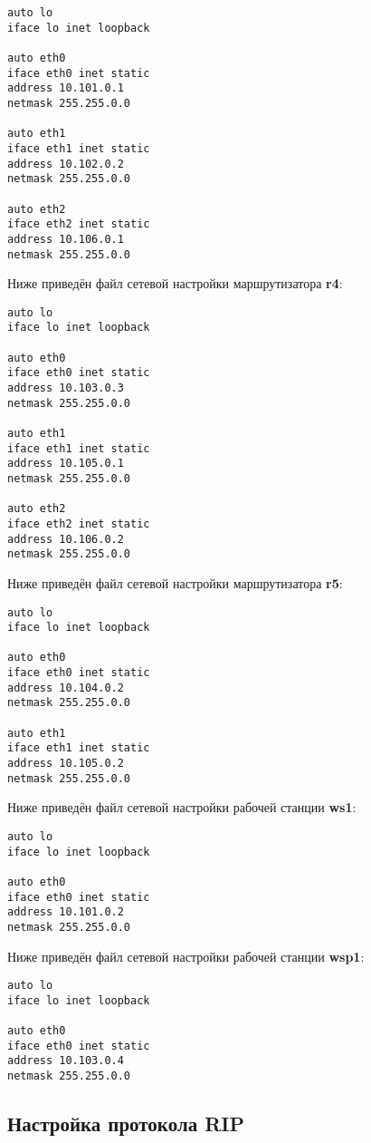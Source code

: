 \documentclass[a4paper,12pt]{article}
\begin{document}
\begin{Verbatim}
auto lo
iface lo inet loopback

auto eth0
iface eth0 inet static
address 10.101.0.1
netmask 255.255.0.0

auto eth1
iface eth1 inet static
address 10.102.0.2
netmask 255.255.0.0

auto eth2
iface eth2 inet static
address 10.106.0.1
netmask 255.255.0.0
\end{Verbatim}

Ниже приведён файл сетевой настройки  маршрутизатора \textbf{r4}:

\begin{Verbatim}
auto lo
iface lo inet loopback

auto eth0
iface eth0 inet static
address 10.103.0.3
netmask 255.255.0.0

auto eth1
iface eth1 inet static
address 10.105.0.1
netmask 255.255.0.0

auto eth2
iface eth2 inet static
address 10.106.0.2
netmask 255.255.0.0
\end{Verbatim}

Ниже приведён файл сетевой настройки  маршрутизатора \textbf{r5}:

\begin{Verbatim}
auto lo
iface lo inet loopback

auto eth0
iface eth0 inet static
address 10.104.0.2
netmask 255.255.0.0

auto eth1
iface eth1 inet static
address 10.105.0.2
netmask 255.255.0.0
\end{Verbatim}

Ниже приведён файл сетевой настройки рабочей станции \textbf{ws1}:

\begin{Verbatim}
auto lo
iface lo inet loopback

auto eth0
iface eth0 inet static
address 10.101.0.2
netmask 255.255.0.0
\end{Verbatim}

Ниже приведён файл сетевой настройки рабочей станции \textbf{wsp1}:

\begin{Verbatim}
auto lo
iface lo inet loopback

auto eth0
iface eth0 inet static
address 10.103.0.4
netmask 255.255.0.0
\end{Verbatim}


\subsection{Настройка протокола RIP}
\end{document}
